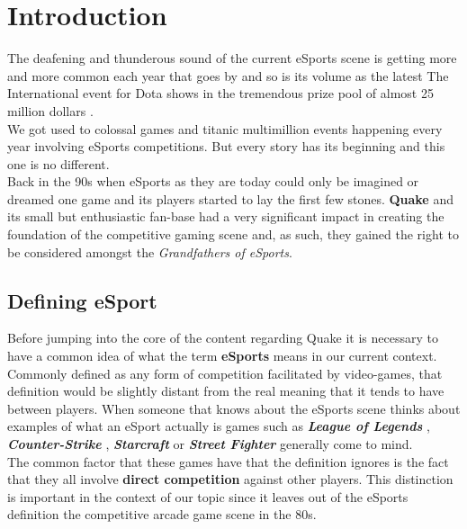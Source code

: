 \section{Introduction}
\label{sec::introduction}

The deafening and thunderous sound of the current eSports scene is getting more and more common each year that goes by and so is its volume as the latest The International event for Dota shows in the tremendous prize pool of almost 25 million dollars \citep{esportsEarnings}.\\

We got used to colossal games and titanic multimillion events happening every year involving eSports competitions. But every story has its beginning and this one is no different.\\

Back in the 90s when eSports as they are today could only be imagined or dreamed one game and its players started to lay the first few stones. \textbf{Quake} and its small but enthusiastic fan-base had a very significant impact in creating the foundation of the competitive gaming scene and, as such, they gained the right to be considered amongst the \textit{Grandfathers of eSports}.\\

\subsection{Defining eSport}

Before jumping into the core of the content regarding Quake it is necessary to have a common idea of what the term \textbf{eSports} means in our current context. Commonly defined as any form of competition facilitated by video-games, that definition would be slightly distant from the real meaning that it tends to have between players. When someone that knows about the eSports scene thinks about examples of what an eSport actually is games such as \textbf{\textit{League of Legends}} \citep{game:league}, \textit{\textbf{Counter-Strike}} \citep{game:cs}, \textbf{\textit{Starcraft}} \citep{game:starcraft} or \textit{\textbf{Street Fighter}} \citep{game:streetfighter} generally come to mind.\\

The common factor that these games have that the definition ignores is the fact that they all involve \textbf{direct competition} against other players. This distinction is important in the context of our topic since it leaves out of the eSports definition the competitive arcade game scene in the 80s.\\

